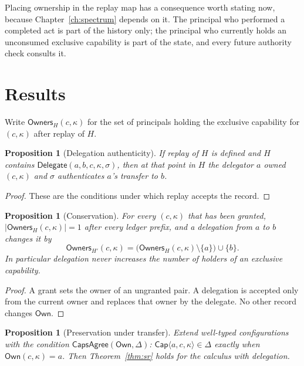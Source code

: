 \documentclass[11pt,openany]{book}
\newtheorem{proposition}[theorem]{Proposition}
\theoremstyle{remark}
\begin{document}
Placing ownership in the replay map has a consequence worth stating
now, because Chapter~\ref{ch:spectrum} depends on it. The principal who
performed a completed act is part of the history only; the principal who
currently holds an unconsumed exclusive capability is part of the state,
and every future authority check consults it.

\section{Results}

Write $\mathsf{Owners}_H(c,\kappa)$ for the set of principals holding the
exclusive capability for $(c,\kappa)$ after replay of $H$.

\begin{proposition}[Delegation authenticity]\label{prop:delauth}
If replay of $H$ is defined and $H$ contains
$\mathsf{Delegate}(a,b,c,\kappa,\sigma)$, then at that point in $H$ the
delegator $a$ owned $(c,\kappa)$ and $\sigma$ authenticates $a$'s transfer
to $b$.
\end{proposition}

\begin{proof}
These are the conditions under which replay accepts the record.
\end{proof}

\begin{proposition}[Conservation]\label{prop:conserve}
For every $(c,\kappa)$ that has been granted, $|\mathsf{Owners}_H(c,\kappa)|=1$
after every ledger prefix, and a delegation from $a$ to $b$ changes it by
\[
\mathsf{Owners}_{H'}(c,\kappa)=
\bigl(\mathsf{Owners}_{H}(c,\kappa)\setminus\{a\}\bigr)\cup\{b\}.
\]
In particular delegation never increases the number of holders of an
exclusive capability.
\end{proposition}

\begin{proof}
A grant sets the owner of an ungranted pair. A delegation is accepted
only from the current owner and replaces that owner by the delegate. No
other record changes $\mathsf{Own}$.
\end{proof}

\begin{proposition}[Preservation under transfer]\label{prop:delpres}
Extend well-typed configurations with the condition
$\mathsf{CapsAgree}(\mathsf{Own},\Delta)$: $\mathsf{Cap}\langle
a,c,\kappa\rangle\in\Delta$ exactly when $\mathsf{Own}(c,\kappa)=a$. Then
Theorem~\ref{thm:sr} holds for the calculus with delegation.
\end{proposition}
\end{document}
